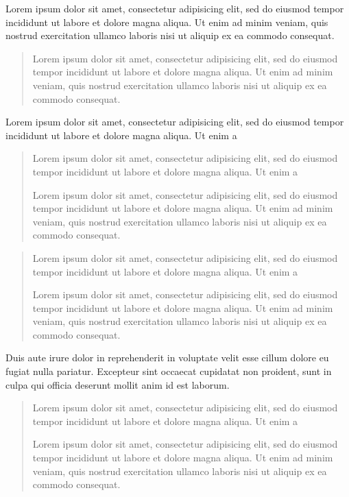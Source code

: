 \documentclass{article}
\begin{document}
    Lorem ipsum dolor sit amet, consectetur adipisicing elit, sed do eiusmod tempor incididunt ut labore et dolore magna aliqua. Ut enim ad minim veniam, quis nostrud exercitation ullamco laboris nisi ut aliquip ex ea commodo consequat. 
    
    \begin{quotation}
        Lorem ipsum dolor sit amet, consectetur adipisicing elit, sed do eiusmod tempor incididunt ut labore et dolore magna aliqua. Ut enim ad minim veniam, quis nostrud exercitation ullamco laboris nisi ut aliquip ex ea commodo consequat. 
    
    \end{quotation}
    
      Lorem ipsum dolor sit amet, consectetur adipisicing elit, sed do eiusmod tempor incididunt ut labore et dolore magna aliqua. Ut enim a
    
    \begin{quote}
    
    Lorem ipsum dolor sit amet, consectetur adipisicing elit, sed do eiusmod tempor incididunt ut labore et dolore magna aliqua. Ut enim a
    
  Lorem ipsum dolor sit amet, consectetur adipisicing elit, sed do eiusmod tempor incididunt ut labore et dolore magna aliqua. Ut enim ad minim veniam, quis nostrud exercitation ullamco laboris nisi ut aliquip ex ea commodo consequat. 
    \end{quote}
\begingroup
  \beginnumbering
	
    \pstart
    \lipsum[1]
    \pend
	

    \pstart
    
    \begin{quotation}
    
    Lorem ipsum dolor sit amet, consectetur adipisicing elit, sed do eiusmod tempor incididunt ut labore et dolore magna aliqua. Ut enim a
    
  Lorem ipsum dolor sit amet, consectetur adipisicing elit, sed do eiusmod tempor incididunt ut labore et dolore magna aliqua. Ut enim ad minim veniam, quis nostrud exercitation ullamco laboris nisi ut aliquip ex ea commodo consequat. 
    \end{quotation}
  
  
   Duis aute irure dolor in reprehenderit in voluptate velit esse cillum dolore eu fugiat nulla pariatur. Excepteur sint occaecat cupidatat non proident, sunt in culpa qui officia deserunt mollit anim id est laborum.
    
     \begin{quote}
    
    Lorem ipsum dolor sit amet, consectetur adipisicing elit, sed do eiusmod tempor incididunt ut labore et dolore magna aliqua. Ut enim a
    
  Lorem ipsum dolor sit amet, consectetur adipisicing elit, sed do eiusmod tempor incididunt ut labore et dolore magna aliqua. Ut enim ad minim veniam, quis nostrud exercitation ullamco laboris nisi ut aliquip ex ea commodo consequat. 
    \end{quote}
    
    \pend
    \pstart
    \lipsum[3]
    \pend

  \endnumbering
\endgroup
\end{document}

